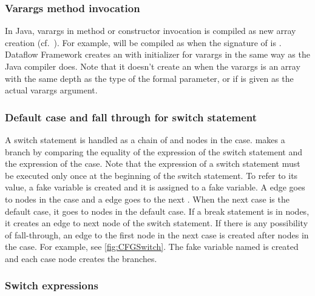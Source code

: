 

\subsubsection{Varargs method invocation}
\label{sec:varargs}

In Java, varargs in method or constructor invocation is compiled
as new array creation (cf.\ ). For example,
 will be compiled as 
when the signature of  is . Dataflow
Framework creates an  with initializer for varargs
in the same way as the Java compiler does.
Note that it doesn't create an 
when the varargs is an array with the same depth as the type of
the formal parameter, or if  is given as the actual varargs argument.

\subsubsection{Default case and fall through for switch statement}
\label{sec:default-switch}

A switch statement is handled as a chain of  and nodes in
the case.  makes a branch by comparing the equality of
the expression of the switch statement and the expression of the case.
Note that the expression of a switch statement must be executed only
once at the beginning of the switch statement. To refer to its value, a fake variable
is created and it is assigned to a fake variable. A 
edge goes to nodes in the case and a  edge goes to the next
. When the next case is the default case, it goes to nodes in the default
case. If a break statement is in nodes, it creates an edge to next node of
the switch statement. If there is any possibility of fall-through, an edge
to the first node in the next case is created after nodes in the case.
For example, see \autoref{fig:CFGSwitch}. The fake variable named 
is created and each case node creates the branches.


\subsubsection{Switch expressions}
\label{sec:switch-expr}

